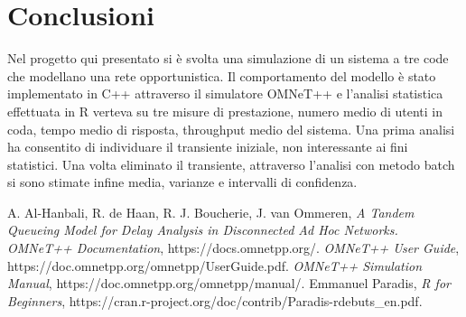 \documentclass[a4paper,11pt]{article}
\begin{document}
\newpage

\section{Conclusioni}
Nel progetto qui presentato si è svolta una simulazione di un sistema a tre code che modellano una rete opportunistica. \newline 
Il comportamento del modello è stato implementato in C++ attraverso il simulatore OMNeT++ e l'analisi statistica effettuata in R verteva su tre misure di prestazione, numero medio di utenti in coda, tempo medio di risposta, throughput medio del sistema. \newline
Una prima analisi ha consentito di individuare il transiente iniziale, non interessante ai fini statistici. 
Una volta eliminato il transiente, attraverso l'analisi con metodo batch si sono stimate infine media, varianze e intervalli di confidenza.

\begin{thebibliography}{90}

 A. Al-Hanbali, R. de Haan, R. J. Boucherie, J. van Ommeren, \textit{A Tandem Queueing Model for Delay Analysis in Disconnected Ad Hoc Networks.}
 \textit{OMNeT++ Documentation}, https://docs.omnetpp.org/.
 \textit{OMNeT++ User Guide}, https://doc.omnetpp.org/omnetpp/UserGuide.pdf.
 \textit{OMNeT++ Simulation Manual}, https://doc.omnetpp.org/omnetpp/manual/.
 Emmanuel Paradis, \textit{R for Beginners}, https://cran.r-project.org/doc/contrib/Paradis-rdebuts\_en.pdf.
\end{thebibliography}
\end{document}
